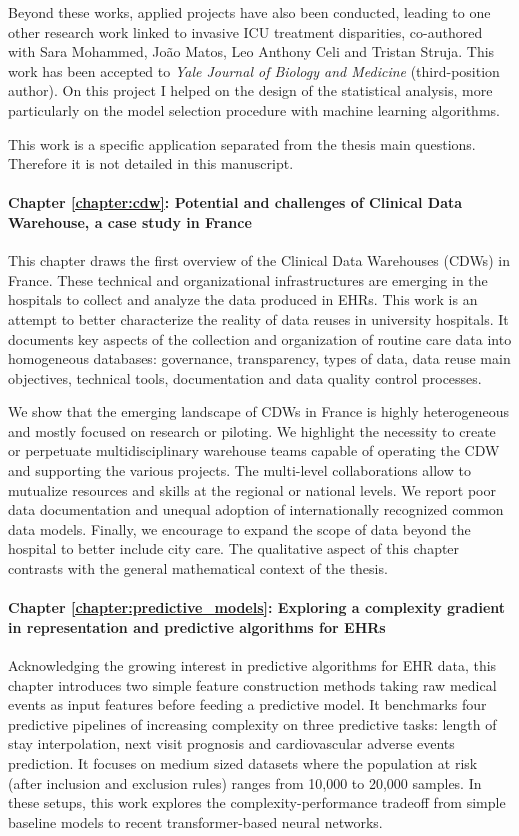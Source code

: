 \documentclass[french,12pt,twoside,a4paper]{book}
\begin{document}
Beyond these works, applied projects have also been conducted, leading to one
other research work linked to invasive ICU treatment disparities, co-authored
with Sara Mohammed, João Matos, Leo Anthony Celi and Tristan Struja. This work
has been accepted to \emph{Yale Journal of Biology and Medicine} (third-position
author). On this project I helped on the design of the statistical analysis,
more particularly on the model selection procedure with machine learning
algorithms.

This work is a specific application separated from the thesis main questions.
Therefore it is not detailed in this manuscript.


\paragraph{Chapter \ref{chapter:cdw}: Potential and challenges of Clinical Data
  Warehouse, a case study in France} This chapter draws the first overview of
the Clinical Data Warehouses (CDWs) in France. These technical and
organizational infrastructures are emerging in the hospitals to collect and
analyze the data produced in EHRs. This work is an
attempt to better characterize the reality of data reuses in university
hospitals. It documents key aspects of the collection and organization of
routine care data into homogeneous databases: governance, transparency, types
of data, data reuse main objectives, technical tools, documentation and data
quality control processes.

We show that the emerging landscape of CDWs in France is highly heterogeneous
and mostly focused on research or piloting. We highlight the necessity to
create or perpetuate multidisciplinary warehouse teams capable of operating
the CDW and supporting the various projects. The multi-level collaborations
allow to mutualize resources and skills at the regional or national levels. We
report poor data documentation and unequal adoption of internationally
recognized common data models. Finally, we encourage to expand the scope of
data beyond the hospital to better include city care. The qualitative aspect
of this chapter contrasts with the general mathematical context of the thesis.

\paragraph{Chapter \ref{chapter:predictive_models}: Exploring a complexity
  gradient in representation and predictive algorithms for EHRs} Acknowledging
the growing interest in predictive algorithms for EHR data, this chapter
introduces two simple feature construction methods taking raw medical events
as input features before feeding a predictive model. It benchmarks four
predictive pipelines of increasing
complexity on three predictive tasks: length of stay interpolation, next visit
prognosis and cardiovascular adverse events prediction. It focuses on medium
sized datasets where the population at risk (after inclusion and exclusion
rules) ranges from 10,000 to 20,000 samples. In these setups, this work
explores the complexity-performance tradeoff from simple baseline models to
recent transformer-based neural networks.
\end{document}
